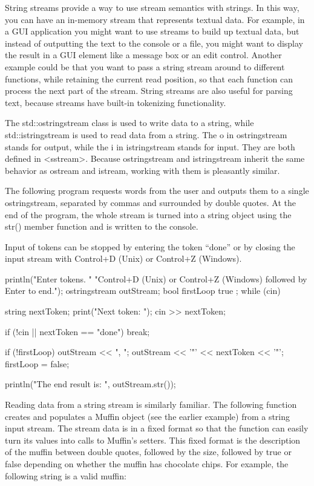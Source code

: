 String streams provide a way to use stream semantics with strings. In this way, you can have an in-memory stream that represents textual data. For example, in a GUI application you might want to use streams to build up textual data, but instead of outputting the text to the console or a file, you might want to display the result in a GUI element like a message box or an edit control. Another example could be that you want to pass a string stream around to different functions, while retaining the current read position, so that each function can process the next part of the stream. String streams are also useful for parsing text, because streams have built-in tokenizing functionality.

The std::ostringstream class is used to write data to a string, while std::istringstream is used to read data from a string. The o in ostringstream stands for output, while the i in istringstream stands for input. They are both defined in <sstream>. Because ostringstream and istringstream inherit the same behavior as ostream and istream, working with them is pleasantly similar.

The following program requests words from the user and outputs them to a single ostringstream, separated by commas and surrounded by double quotes. At the end of the program, the whole stream is turned into a string object using the str() member function and is written to the console.

Input of tokens can be stopped by entering the token “done” or by closing the input stream with Control+D (Unix) or Control+Z (Windows).

\begin{cpp}
println("Enter tokens. "
        "Control+D (Unix) or Control+Z (Windows) followed by Enter to end.");
ostringstream outStream;
bool firstLoop { true };
while (cin) {
    string nextToken;
    print("Next token: ");
    cin >> nextToken;

    if (!cin || nextToken == "done") { break; }

    if (!firstLoop) { outStream << ", "; }
    outStream << '"' << nextToken << '"';
    firstLoop = false;
}
println("The end result is: {}", outStream.str());
\end{cpp}

Reading data from a string stream is similarly familiar. The following function creates and populates a Muffin object (see the earlier example) from a string input stream. The stream data is in a fixed format so that the function can easily turn its values into calls to Muffin’s setters. This fixed format is the description of the muffin between double quotes, followed by the size, followed by true or false depending on whether the muffin has chocolate chips. For example, the following string is a valid muffin:

